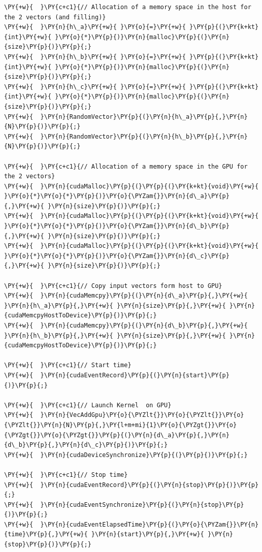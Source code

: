 \begin{Verbatim}[label=\makebox{\url{https://github.com/lucabaldini/cmepda/tree/master/slides/latex/snippets/cuda_vec_add_gpu.cu}},commandchars=\\\{\}]
\PY{+w}{  }\PY{c+c1}{// Allocation of a memory space in the host for the 2 vectors (and filling)}
\PY{+w}{  }\PY{n}{h\_a}\PY{+w}{ }\PY{o}{=}\PY{+w}{ }\PY{p}{(}\PY{k+kt}{int}\PY{+w}{ }\PY{o}{*}\PY{p}{)}\PY{n}{malloc}\PY{p}{(}\PY{n}{size}\PY{p}{)}\PY{p}{;}
\PY{+w}{  }\PY{n}{h\_b}\PY{+w}{ }\PY{o}{=}\PY{+w}{ }\PY{p}{(}\PY{k+kt}{int}\PY{+w}{ }\PY{o}{*}\PY{p}{)}\PY{n}{malloc}\PY{p}{(}\PY{n}{size}\PY{p}{)}\PY{p}{;}
\PY{+w}{  }\PY{n}{h\_c}\PY{+w}{ }\PY{o}{=}\PY{+w}{ }\PY{p}{(}\PY{k+kt}{int}\PY{+w}{ }\PY{o}{*}\PY{p}{)}\PY{n}{malloc}\PY{p}{(}\PY{n}{size}\PY{p}{)}\PY{p}{;}
\PY{+w}{  }\PY{n}{RandomVector}\PY{p}{(}\PY{n}{h\_a}\PY{p}{,}\PY{n}{N}\PY{p}{)}\PY{p}{;}
\PY{+w}{  }\PY{n}{RandomVector}\PY{p}{(}\PY{n}{h\_b}\PY{p}{,}\PY{n}{N}\PY{p}{)}\PY{p}{;}

\PY{+w}{  }\PY{c+c1}{// Allocation of a memory space in the GPU for the 2 vectors}
\PY{+w}{  }\PY{n}{cudaMalloc}\PY{p}{(}\PY{p}{(}\PY{k+kt}{void}\PY{+w}{ }\PY{o}{*}\PY{o}{*}\PY{p}{)}\PY{o}{\PYZam{}}\PY{n}{d\_a}\PY{p}{,}\PY{+w}{ }\PY{n}{size}\PY{p}{)}\PY{p}{;}
\PY{+w}{  }\PY{n}{cudaMalloc}\PY{p}{(}\PY{p}{(}\PY{k+kt}{void}\PY{+w}{ }\PY{o}{*}\PY{o}{*}\PY{p}{)}\PY{o}{\PYZam{}}\PY{n}{d\_b}\PY{p}{,}\PY{+w}{ }\PY{n}{size}\PY{p}{)}\PY{p}{;}
\PY{+w}{  }\PY{n}{cudaMalloc}\PY{p}{(}\PY{p}{(}\PY{k+kt}{void}\PY{+w}{ }\PY{o}{*}\PY{o}{*}\PY{p}{)}\PY{o}{\PYZam{}}\PY{n}{d\_c}\PY{p}{,}\PY{+w}{ }\PY{n}{size}\PY{p}{)}\PY{p}{;}

\PY{+w}{  }\PY{c+c1}{// Copy input vectors form host to GPU}
\PY{+w}{  }\PY{n}{cudaMemcpy}\PY{p}{(}\PY{n}{d\_a}\PY{p}{,}\PY{+w}{ }\PY{n}{h\_a}\PY{p}{,}\PY{+w}{ }\PY{n}{size}\PY{p}{,}\PY{+w}{ }\PY{n}{cudaMemcpyHostToDevice}\PY{p}{)}\PY{p}{;}
\PY{+w}{  }\PY{n}{cudaMemcpy}\PY{p}{(}\PY{n}{d\_b}\PY{p}{,}\PY{+w}{ }\PY{n}{h\_b}\PY{p}{,}\PY{+w}{ }\PY{n}{size}\PY{p}{,}\PY{+w}{ }\PY{n}{cudaMemcpyHostToDevice}\PY{p}{)}\PY{p}{;}

\PY{+w}{  }\PY{c+c1}{// Start time}
\PY{+w}{  }\PY{n}{cudaEventRecord}\PY{p}{(}\PY{n}{start}\PY{p}{)}\PY{p}{;}

\PY{+w}{  }\PY{c+c1}{// Launch Kernel  on GPU}
\PY{+w}{  }\PY{n}{VecAddGpu}\PY{o}{\PYZlt{}}\PY{o}{\PYZlt{}}\PY{o}{\PYZlt{}}\PY{n}{N}\PY{p}{,}\PY{l+m+mi}{1}\PY{o}{\PYZgt{}}\PY{o}{\PYZgt{}}\PY{o}{\PYZgt{}}\PY{p}{(}\PY{n}{d\_a}\PY{p}{,}\PY{n}{d\_b}\PY{p}{,}\PY{n}{d\_c}\PY{p}{)}\PY{p}{;}
\PY{+w}{  }\PY{n}{cudaDeviceSynchronize}\PY{p}{(}\PY{p}{)}\PY{p}{;}

\PY{+w}{  }\PY{c+c1}{// Stop time}
\PY{+w}{  }\PY{n}{cudaEventRecord}\PY{p}{(}\PY{n}{stop}\PY{p}{)}\PY{p}{;}
\PY{+w}{  }\PY{n}{cudaEventSynchronize}\PY{p}{(}\PY{n}{stop}\PY{p}{)}\PY{p}{;}
\PY{+w}{  }\PY{n}{cudaEventElapsedTime}\PY{p}{(}\PY{o}{\PYZam{}}\PY{n}{time}\PY{p}{,}\PY{+w}{ }\PY{n}{start}\PY{p}{,}\PY{+w}{ }\PY{n}{stop}\PY{p}{)}\PY{p}{;}


\end{Verbatim}
